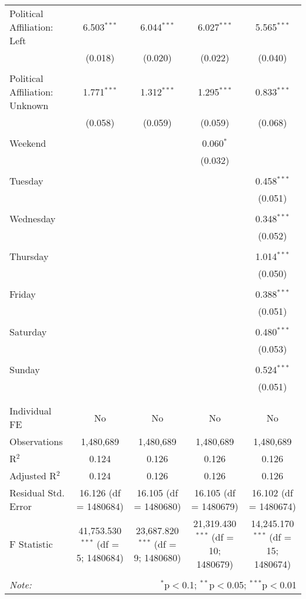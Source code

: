 \documentclass[
]{article}
\begin{document}
\begin{table}[!htbp]
{\begin{tabular}{@{\extracolsep{5pt}}lcccc}
 Political Affiliation: Left & 6.503$^{***}$ & 6.044$^{***}$ & 6.027$^{***}$ & 5.565$^{***}$ \\ 
  & (0.018) & (0.020) & (0.022) & (0.040) \\ 
  & & & & \\ 
 Political Affiliation: Unknown & 1.771$^{***}$ & 1.312$^{***}$ & 1.295$^{***}$ & 0.833$^{***}$ \\ 
  & (0.058) & (0.059) & (0.059) & (0.068) \\ 
  & & & & \\ 
 Weekend &  &  & 0.060$^{*}$ &  \\ 
  &  &  & (0.032) &  \\ 
  & & & & \\ 
 Tuesday &  &  &  & 0.458$^{***}$ \\ 
  &  &  &  & (0.051) \\ 
  & & & & \\ 
 Wednesday &  &  &  & 0.348$^{***}$ \\ 
  &  &  &  & (0.052) \\ 
  & & & & \\ 
 Thursday &  &  &  & 1.014$^{***}$ \\ 
  &  &  &  & (0.050) \\ 
  & & & & \\ 
 Friday &  &  &  & 0.388$^{***}$ \\ 
  &  &  &  & (0.051) \\ 
  & & & & \\ 
 Saturday &  &  &  & 0.480$^{***}$ \\ 
  &  &  &  & (0.053) \\ 
  & & & & \\ 
 Sunday &  &  &  & 0.524$^{***}$ \\ 
  &  &  &  & (0.051) \\ 
  & & & & \\ 
\hline \\[-1.8ex] 
Individual FE & No & No & No & No \\ 
Observations & 1,480,689 & 1,480,689 & 1,480,689 & 1,480,689 \\ 
R$^{2}$ & 0.124 & 0.126 & 0.126 & 0.126 \\ 
Adjusted R$^{2}$ & 0.124 & 0.126 & 0.126 & 0.126 \\ 
Residual Std. Error & 16.126 (df = 1480684) & 16.105 (df = 1480680) & 16.105 (df = 1480679) & 16.102 (df = 1480674) \\ 
F Statistic & 41,753.530$^{***}$ (df = 5; 1480684) & 23,687.820$^{***}$ (df = 9; 1480680) & 21,319.430$^{***}$ (df = 10; 1480679) & 14,245.170$^{***}$ (df = 15; 1480674) \\ 
\hline 
\hline \\[-1.8ex] 
\textit{Note:}  & \multicolumn{4}{r}{$^{*}$p$<$0.1; $^{**}$p$<$0.05; $^{***}$p$<$0.01} \\ 
\end{tabular}
} 
\end{table} 
\newpage
\end{document}
